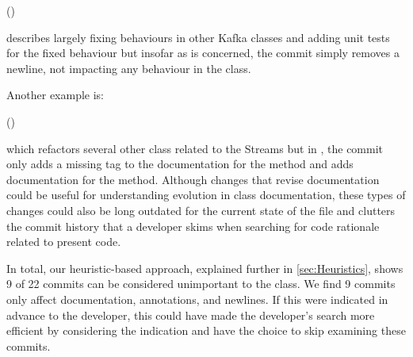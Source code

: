 \begin{center}
	 ()
\end{center}

\noindent describes largely fixing behaviours in other Kafka classes and adding unit tests for the fixed behaviour 
but insofar as  is concerned, the commit simply removes a newline, not impacting any behaviour in the class.

Another example is: 

\begin{center}
	 ()
\end{center}

\noindent which refactors several other class related to the Streams  
but in , the commit only adds a missing  tag 
to the documentation for the  method 
and adds documentation for the  method.
Although changes that revise documentation could be useful for understanding evolution in class documentation, 
these types of changes could also be long outdated for the current state of the file 
and clutters the commit history that a developer skims when searching for code rationale related to present code.

In total, our heuristic-based approach, explained further in \autoref{sec:Heuristics}, 
shows 9 of 22 commits can be considered unimportant to the  class. 
We find 9 commits only affect documentation, annotations, and newlines.
If this were indicated in advance to the developer, this could have made the developer's search more efficient 
by considering the indication and have the choice to skip examining these commits.

